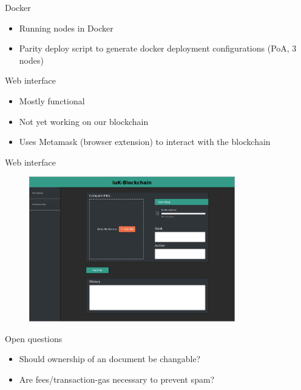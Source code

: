 \documentclass[10pt]{beamer}
\begin{document}
\begin{frame}{Docker}
	\begin{itemize}
		\item Running nodes in Docker
		\item Parity deploy script to generate docker deployment configurations (PoA, 3 nodes)
	\end{itemize}
\end{frame}

\begin{frame}{Web interface}
	\begin{itemize}
		\item Mostly functional
		\item Not yet working on our blockchain
		\item Uses Metamask (browser extension) to interact with the blockchain
	\end{itemize}
\end{frame}

\begin{frame}{Web interface}
	\begin{figure}
		\includegraphics[width=0.8\textwidth]{images/GUI-180603_1.png}
	\end{figure}
\end{frame}

\begin{frame}{Open questions}
	\begin{itemize}
		\item Should ownership of an document be changable?
		\item Are fees/transaction-gas necessary to prevent spam?
	\end{itemize}
\end{frame}

\end{document}
